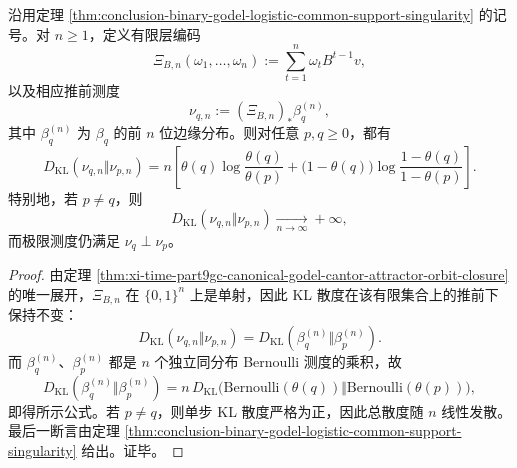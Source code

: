 \begin{corollary}\label{cor:conclusion-binary-godel-logistic-finitelevel-kl-linear}
沿用定理 \ref{thm:conclusion-binary-godel-logistic-common-support-singularity} 的记号。对 \(n\ge 1\)，定义有限层编码
\[
\Xi_{B,n}(\omega_1,\dots,\omega_n):=\sum_{t=1}^{n}\omega_t B^{t-1}v,
\]
以及相应推前测度
\[
\nu_{q,n}:=(\Xi_{B,n})_*\beta_q^{(n)},
\]
其中 \(\beta_q^{(n)}\) 为 \(\beta_q\) 的前 \(n\) 位边缘分布。则对任意 \(p,q\ge 0\)，都有
\[
\boxed{\;
D_{\mathrm{KL}}(\nu_{q,n}\Vert \nu_{p,n})
=
n\left[
\theta(q)\log\frac{\theta(q)}{\theta(p)}
+
\bigl(1-\theta(q)\bigr)\log\frac{1-\theta(q)}{1-\theta(p)}
\right].\;}
\]
特别地，若 \(p\neq q\)，则
\[
\boxed{\;
D_{\mathrm{KL}}(\nu_{q,n}\Vert \nu_{p,n})\xrightarrow[n\to\infty]{}+\infty,\;}
\]
而极限测度仍满足 \(\nu_q\perp \nu_p\)。
\end{corollary}
\begin{proof}
由定理 \ref{thm:xi-time-part9gc-canonical-godel-cantor-attractor-orbit-closure} 的唯一展开，\(\Xi_{B,n}\) 在 \(\{0,1\}^n\) 上是单射，因此 KL 散度在该有限集合上的推前下保持不变：
\[
D_{\mathrm{KL}}(\nu_{q,n}\Vert \nu_{p,n})
=
D_{\mathrm{KL}}(\beta_q^{(n)}\Vert \beta_p^{(n)}).
\]
而 \(\beta_q^{(n)}\)、\(\beta_p^{(n)}\) 都是 \(n\) 个独立同分布 Bernoulli 测度的乘积，故
\[
D_{\mathrm{KL}}(\beta_q^{(n)}\Vert \beta_p^{(n)})
=
n\,D_{\mathrm{KL}}\!\bigl(\mathrm{Bernoulli}(\theta(q))\Vert \mathrm{Bernoulli}(\theta(p))\bigr),
\]
即得所示公式。若 \(p\neq q\)，则单步 KL 散度严格为正，因此总散度随 \(n\) 线性发散。最后一断言由定理 \ref{thm:conclusion-binary-godel-logistic-common-support-singularity} 给出。证毕。
\end{proof}


